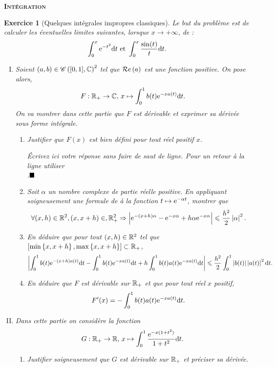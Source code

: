 \documentclass[a4paper, 10pt]{article}
\def\datederemise{jeudi 19 mars}
\def\Titre{Intégration}
\newcommand{\sujet}[1]{}
\newcommand{\reponse}[1]{\textit{#1}}
\theoremstyle{exo}
\newtheorem{exo}{Exercice}
\begin{document}
\pagestyle{fancy}

\begin{center}
\textsc{\bfseries\huge \Titre}
\end{center}
\noindent\sujet{{\small Ce DM est à me remettre le \datederemise.
Vous rédigerez ce DM en binôme.}}

\begin{exo}[Quelques intégrales impropres classiques]
  Le but du problème est de calculer les éventuelles limites suivantes, lorsque $x\to +\infty$, de :
  $$\int_0^x\e^{-t^2}\d t \et \int_0^x\frac{\sin(t)}{t}\d t.$$
  \begin{enumerate}[I.]
  \item Soient $(a,b)\in \cont{[0,1]}{\C}^2$ tel que $\re{a}$ est une fonction positive. On pose alors,
    $$F:\R_+\to\C,\,x\mapsto\int_0^1b(t)\e^{-xa(t)}\d t.$$
    On va montrer dans cette partie que $F$ est dérivable et exprimer sa dérivée sous forme intégrale.
    \begin{enumerate}[1.]
    \item Justifier que $F(x)$ est bien défini pour tout réel positif $x$.

      \reponse{Écrivez ici votre réponse sans faire de saut de ligne. Pour un retour à la ligne utiliser \texttt{\\}.$\qed$}
    \item Soit $\alpha$ un nombre complexe de partie réelle positive. En appliquant soigneusement une formule de  à la fonction $t\mapsto \e^{-\alpha t}$, montrer que
      $$\forall (x,h)\in\R^2,(x,x+h)\in,\R_+^2\Rightarrow \va{\e^{-(x+h)\alpha}-\e^{-x\alpha}+h\alpha\e^{-x\alpha}}\leq \frac{h^2}{2}\va{\alpha}^2.$$

      \reponse{}
    \item En déduire que pour tout $(x,h)\in\R^2$ tel que $[\min\left\{x,x+h\right\},\max\left\{x,x+h\right\}]\subset\R_+$,
      $$\va{\int_0^1b(t)\e^{-(x+h)a(t)}\d t-\int_0^1b(t)\e^{-xa(t)}\d t+h\int_0^1b(t)a(t)\e^{-xa(t)}\d t}\leq \frac{h^2}{2} \int_0^1\va{b(t)}\va{a(t)}^2\d t.$$

\reponse{}
  \item En déduire que $F$ est dérivable sur $\R_+$ et que pour tout réel $x$ positif,
    $$F'(x)=-\int_0^1b(t)a(t)\e^{-xa(t)}\d t.$$

\reponse{}
  \end{enumerate}
\item Dans cette partie on considère la fonction
  $$G:\R_+\to \R,\,x\mapsto \int_0^1\frac{\e^{-x(1+t^2)}}{1+t^2}\d t.$$
  \begin{enumerate}[1.]
  \item Justifier soigneusement que $G$ est dérivable sur $\R_+$ et préciser sa dérivée.


\end{enumerate}
\end{enumerate}
\end{exo}
\end{document}
